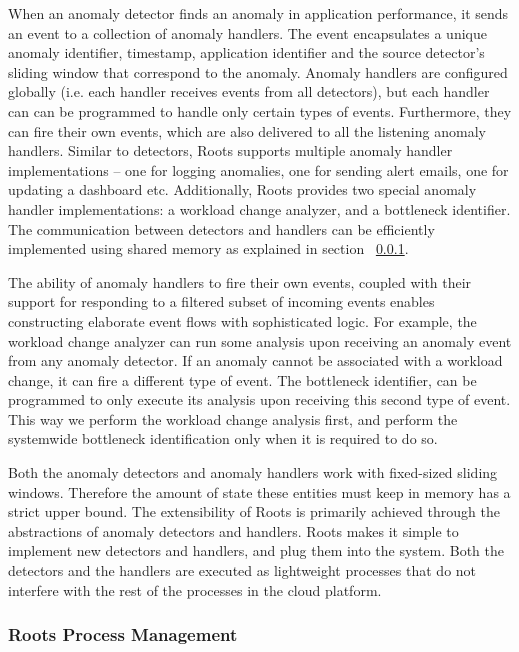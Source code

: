 When an anomaly detector finds an anomaly in application performance, it sends an event
to a collection of anomaly handlers. The event encapsulates a unique anomaly identifier, 
timestamp, application identifier and the source detector's sliding window that correspond to the
anomaly. Anomaly handlers are configured globally (i.e. each handler
receives events from all detectors), but each handler can can be programmed to handle only
certain types of events. Furthermore, they can fire their own events, which are also delivered to
all the listening anomaly handlers. Similar to detectors, Roots supports multiple anomaly handler
implementations -- one for logging anomalies, one for sending alert emails, one
for updating a dashboard etc. Additionally, Roots provides two special anomaly handler
implementations: a workload change analyzer, and a bottleneck identifier.
The communication between detectors and handlers can be efficiently implemented
using shared memory as explained in section ~\ref{sec:process_mgt}.

The ability of anomaly handlers to fire their own events, coupled with their support
for responding to a filtered subset of incoming events enables constructing
elaborate event flows with sophisticated logic. For example, the workload
change analyzer can run some analysis upon receiving an anomaly event
from any anomaly detector. If an anomaly cannot be associated with a workload
change, it can fire a different type of event. The bottleneck identifier, can
be programmed to only execute its analysis upon receiving this second type of event.
This way we perform the workload change analysis first, and perform the
systemwide bottleneck identification only when it is required to do so.

Both the anomaly detectors and anomaly handlers work with fixed-sized sliding windows.
Therefore the amount of state these entities must keep in memory has
a strict upper bound. 
The extensibility of Roots is primarily achieved through the abstractions of anomaly
detectors and handlers. Roots makes it simple to implement new detectors and handlers,
and plug them into the system. Both the detectors and the handlers are executed
as lightweight processes that do not interfere with the rest of the processes in
the cloud platform. 

\subsubsection{Roots Process Management}
\label{sec:process_mgt}

